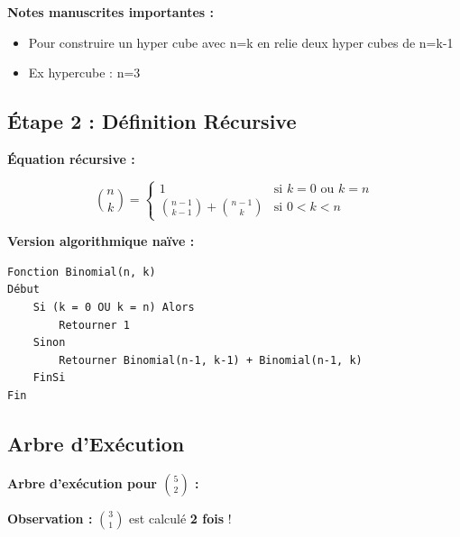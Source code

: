 \documentclass[12pt,a4paper]{article}
\begin{document}
\begin{notecours}
\textbf{Notes manuscrites importantes :}
\begin{itemize}
    \item Pour construire un hyper cube avec n=k en relie deux hyper cubes de n=k-1
    \item Ex hypercube : n=3
\end{itemize}
\end{notecours}

\subsection{Étape 2 : Définition Récursive}

\begin{algorithme}
\textbf{Équation récursive :}

\[
\binom{n}{k} = \begin{cases}
1 & \text{si } k = 0 \text{ ou } k = n \\
\binom{n-1}{k-1} + \binom{n-1}{k} & \text{si } 0 < k < n
\end{cases}
\]

\textbf{Version algorithmique naïve :}
\begin{verbatim}
Fonction Binomial(n, k)
Début
    Si (k = 0 OU k = n) Alors
        Retourner 1
    Sinon
        Retourner Binomial(n-1, k-1) + Binomial(n-1, k)
    FinSi
Fin
\end{verbatim}
\end{algorithme}

\subsection{Arbre d'Exécution}

\begin{exemple}
\textbf{Arbre d'exécution pour $\binom{5}{2}$ :}

\begin{center}
\end{center}

\textbf{Observation :} $\binom{3}{1}$ est calculé \textcolor{importantrouge}{\textbf{2 fois}} !
\end{exemple}
\end{document}

